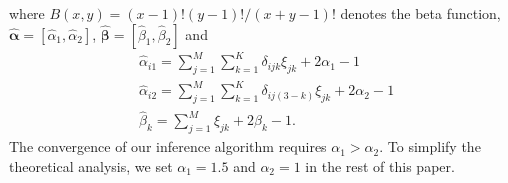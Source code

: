 where $B(x,y)=(x-1)!(y-1)!/(x+y-1)!$ denotes the beta function, $\hat{\bm{\alpha}}=[\hat{\alpha}_1,\hat{\alpha}_2]$, $\hat{\bm{\beta}}=[\hat{\beta}_1,\hat{\beta}_2]$ and
\begin{equation*}
\begin{split}
&\hat{\alpha}_{i1}={\sum}_{j=1}^{M}{\sum}_{k=1}^{K}\delta_{ijk}\xi_{jk}+2\alpha_{1}-1\\
&\hat{\alpha}_{i2}={\sum}_{j=1}^{M}{\sum}_{k=1}^{K}\delta_{ij(3-k)}\xi_{jk}+2\alpha_{2}-1\\
&\hat{\beta}_k={\sum}_{j=1}^{M}\xi_{jk}+2\beta_{k}-1.
\end{split}
\end{equation*}
The convergence of our inference algorithm requires $\alpha_1>\alpha_2$.
To simplify the theoretical analysis, we set $\alpha_1=1.5$ and $\alpha_2=1$ in the rest of this paper.

